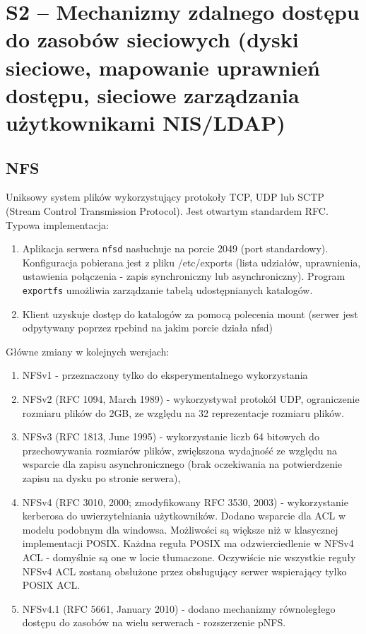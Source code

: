 \section{S2 -- Mechanizmy  zdalnego  dostępu  do  zasobów  sieciowych (dyski  sieciowe,  mapowanie  uprawnień  dostępu,  sieciowe zarządzania użytkownikami NIS/LDAP) }

\subsection{NFS}
Uniksowy system plików wykorzystujący protokoły TCP, UDP lub SCTP (Stream Control Transmission Protocol). Jest otwartym standardem RFC.
Typowa implementacja:
\begin{enumerate}
	\item Aplikacja serwera \texttt{nfsd} nasłuchuje na porcie 2049 (port standardowy). Konfiguracja pobierana jest z pliku /etc/exports (lista udziałów, uprawnienia, ustawienia połączenia - zapis synchroniczny lub asynchroniczny). Program \texttt{exportfs} umożliwia zarządzanie tabelą udostępnianych katalogów.
	\item Klient uzyskuje dostęp do katalogów za pomocą polecenia mount (serwer jest odpytywany poprzez rpcbind na jakim porcie działa nfsd)
\end{enumerate}

Główne zmiany w kolejnych wersjach:
\begin{enumerate}
	\item NFSv1 - przeznaczony tylko do eksperymentalnego wykorzystania
	\item NFSv2 (RFC 1094, March 1989) - wykorzystywał protokół UDP, ograniczenie rozmiaru plików do 2GB, ze względu na 32 reprezentacje rozmiaru plików.
	\item NFSv3 (RFC 1813, June 1995) - wykorzystanie liczb 64 bitowych do przechowywania rozmiarów plików, zwiększona wydajność ze względu na wsparcie dla zapisu asynchronicznego (brak oczekiwania na potwierdzenie zapisu na dysku po stronie serwera), 
	\item NFSv4 (RFC 3010, 2000; zmodyfikowany RFC 3530, 2003) - wykorzystanie kerberosa do uwierzytelniania użytkowników. Dodano wsparcie dla ACL w modelu podobnym dla windowsa. Możliwości są większe niż w klasycznej implementacji POSIX. Każdna reguła POSIX ma odzwierciedlenie w NFSv4 ACL - domyślnie są one w locie tłumaczone. Oczywiście nie wszystkie reguły NFSv4 ACL zostaną obsłużone przez obsługujący serwer wspierający tylko POSIX ACL.
	\item NFSv4.1 (RFC 5661, January 2010) - dodano mechanizmy równoległego dostępu do zasobów na wielu serwerach - rozszerzenie pNFS.
\end{enumerate}

